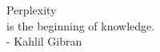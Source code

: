 

\newpage \vspace*{8cm}
\label{har:perplexity}
\begin{center}
\large Perplexity\\
is the beginning of knowledge.
\vspace{4mm}
\\
- Kahlil Gibran\\
\vspace{2mm}
\autocite[33]{CloudNativ:1}
\end{center}


\newpage